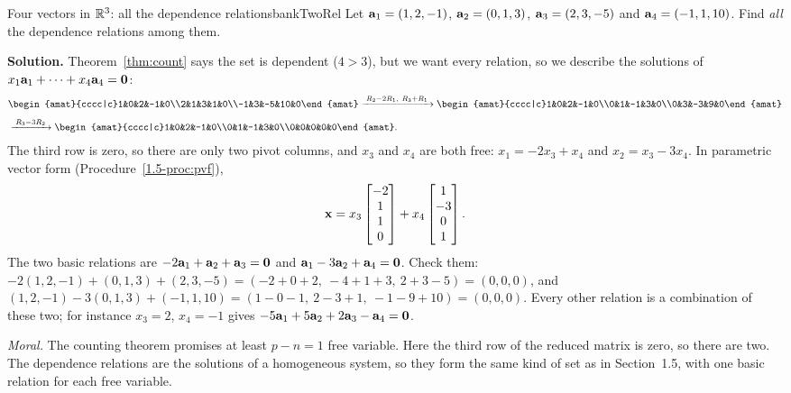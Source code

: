 \documentclass[11pt]{article}
\begin{document}
\begin{exmp}{Four vectors in $\mathbb{R}^3$: all the dependence relations}{bankTwoRel}
Let $\mathbf{a}_1=(1,2,-1)$, $\mathbf{a}_2=(0,1,3)$, $\mathbf{a}_3=(2,3,-5)$ and $\mathbf{a}_4=(-1,1,10)$. Find \emph{all} the dependence relations among them.

\textbf{Solution.} Theorem~\ref{thm:count} says the set is dependent ($4>3$), but we want every relation, so we describe the solutions of $x_1\mathbf{a}_1+\cdots+x_4\mathbf{a}_4=\mathbf{0}$:
\begin{align*}
&\begin{amat}{cccc|c}1&0&2&-1&0\\2&1&3&1&0\\-1&3&-5&10&0\end{amat}
\rops{R_2-2R_1,\ R_3+R_1}
\begin{amat}{cccc|c}1&0&2&-1&0\\0&1&-1&3&0\\0&3&-3&9&0\end{amat}\\[4pt]
&\rops{R_3-3R_2}
\begin{amat}{cccc|c}1&0&2&-1&0\\0&1&-1&3&0\\0&0&0&0&0\end{amat}.
\end{align*}
The third row is zero, so there are only two pivot columns, and $x_3$ and $x_4$ are both free: $x_1=-2x_3+x_4$ and $x_2=x_3-3x_4$. In parametric vector form (Procedure~\ref{1.5-proc:pvf}),
\[
\mathbf{x}=x_3\begin{bmatrix}-2\\1\\1\\0\end{bmatrix}+x_4\begin{bmatrix}1\\-3\\0\\1\end{bmatrix}.
\]
The two basic relations are $-2\mathbf{a}_1+\mathbf{a}_2+\mathbf{a}_3=\mathbf{0}$ and $\mathbf{a}_1-3\mathbf{a}_2+\mathbf{a}_4=\mathbf{0}$. Check them: $-2(1,2,-1)+(0,1,3)+(2,3,-5)=(-2+0+2,\ -4+1+3,\ 2+3-5)=(0,0,0)$, and $(1,2,-1)-3(0,1,3)+(-1,1,10)=(1-0-1,\ 2-3+1,\ -1-9+10)=(0,0,0)$. Every other relation is a combination of these two; for instance $x_3=2$, $x_4=-1$ gives $-5\mathbf{a}_1+5\mathbf{a}_2+2\mathbf{a}_3-\mathbf{a}_4=\mathbf{0}$.

\emph{Moral.} The counting theorem promises at least $p-n=1$ free variable. Here the third row of the reduced matrix is zero, so there are two. The dependence relations are the solutions of a homogeneous system, so they form the same kind of set as in Section~1.5, with one basic relation for each free variable.
\end{exmp}
\end{document}
